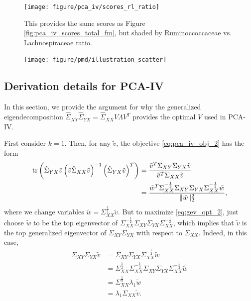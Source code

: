 \documentclass{article}
\begin{document}
\begin{figure}[ht]
  \centering
  \texttt{[image: figure/pca\_iv/scores\_rl\_ratio]}
  \caption{This provides the same scores as Figure
    \ref{fig:pca_iv_scores_total_fm}, but shaded by Ruminoccoccaceae vs.
    Lachnospiraceae ratio. \label{fig:pca_iv_scores_rl_ratio} }
\end{figure}

\begin{figure}[ht]
  \centering
  \texttt{[image: figure/pmd/illustration\_scatter]}
  \caption{\label{fig:pmd_illustration_scatter} }
\end{figure}



\subsection{Derivation details for PCA-IV}
\label{subsec:pca_iv_derivation}

In this section, we provide the argument for why the generalized
eigendecomposition $\hat{\Sigma}_{XY}\hat{\Sigma}_{YX} =
\hat{\Sigma}_{XX}V\Lambda V^{T}$ provides the optimal $V$ used in PCA-IV.

First consider $k = 1$. Then, for any $\tilde{v}$, the objective
\ref{eq:pca_iv_obj_2} has the form
\begin{align}
  \mathop\mathrm{tr}\left(\hat{\Sigma}_{YX}\tilde{v}\left(\tilde{v}\hat{\Sigma}_{XX}\tilde{v}\right)^{-1}
  \left(\hat{\Sigma}_{YX}\tilde{v}\right)^{T}\right) &=
  \frac{\tilde{v}^{T}\Sigma_{XY}\Sigma_{YX}\tilde{v}}{\tilde{v}^{T}\Sigma_{XX}\tilde{v}} \label{eq:gev_opt_1}\\
  &= \frac{\tilde{w}^{T}\Sigma_{XX}^{-\frac{1}{2}}\Sigma_{XY}\Sigma_{YX}\Sigma_{XX}^{-\frac{1}{2}}\tilde{w}}{\|\tilde{w}\|_{2}^{2}}, \label{eq:gev_opt_2}
\end{align}
where we change variables $\tilde{w} = \Sigma_{XX}^{\frac{1}{2}}\tilde{v}$. But
to maximize \ref{eq:gev_opt_2}, just choose $\tilde{w}$ to be the top
eigenvector of
$\Sigma_{XX}^{-\frac{1}{2}}\Sigma_{XY}\Sigma_{YX}\Sigma_{XX}^{-\frac{1}{2}}$,
which implies that $\tilde{v}$ is the top generalized eigenvector of
$\Sigma_{XY}\Sigma_{YX}$ with respect to $\Sigma_{XX}$. Indeed, in this case,
\begin{align*}
  \Sigma_{XY}\Sigma_{YX}\tilde{v}
  &=\Sigma_{XY}\Sigma_{YX}\Sigma_{XX}^{-\frac{1}{2}}\tilde{w} \\
  &= \Sigma_{XX}^{\frac{1}{2}} \Sigma_{XX}^{-\frac{1}{2}}\Sigma_{XY}\Sigma_{YX} \Sigma_{XX}^{-\frac{1}{2}}\tilde{w}\\
  &= \Sigma_{XX}^{\frac{1}{2}}\lambda_{1}\tilde{w} \\
  &= \lambda_{1}\Sigma_{XX}\tilde{v}.
\end{align*}
\end{document}
